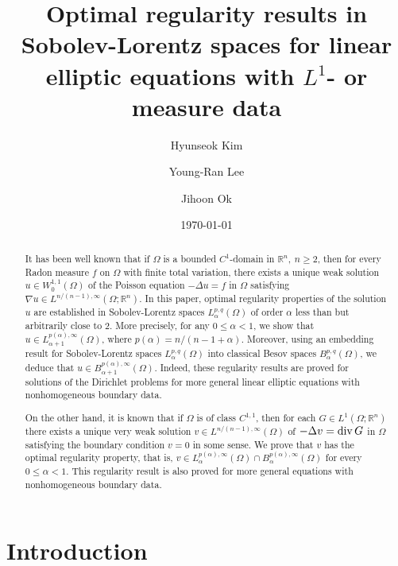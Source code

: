 \documentclass[reqno,centertags,11pt]{amsart}
\title[Optimal regularity results in Sobolev-Lorentz spaces]{Optimal regularity results in Sobolev-Lorentz spaces   for linear elliptic   equations with $L^1$- or measure data}
\date{\today}
\author[H. Kim]{Hyunseok Kim}
\author[Y.-R. Lee]{Young-Ran Lee}
\author[J. Ok]{Jihoon Ok}
\theoremstyle{definition}
\numberwithin{thm}{section}
\numberwithin{equation}{section}
\newcommand{\R}{{\mathbb{R}}}
\begin{document}
\begin{abstract}
It has been  well known that if  $\Omega$ is a bounded $C^1$-domain in $\R^n,\ n \ge 2$, then   for every Radon measure $f$ on $\Omega$ with finite total variation,  there exists a unique weak solution   $u\in W_0^{1,1}(\Omega )$ of the Poisson equation   $-\Delta u=f$ in $\Omega$ satisfying  $\nabla u \in L^{n/(n-1),\infty}(\Omega;\R^n )$. In this paper, optimal regularity properties of the solution $u$ are established   in Sobolev-Lorentz spaces $L_{\alpha}^{p,q}(\Omega )$   of order $ \alpha$ less than but arbitrarily close to $2$. More precisely, for any $0 \le \alpha<1$, we show that $u\in L_{\alpha+1}^{p(\alpha),\infty}(\Omega )$, where  $p(\alpha )= n/(n-1+\alpha )$. Moreover, using  an embedding result for Sobolev-Lorentz spaces $L_{\alpha}^{p,q}(\Omega )$ into classical   Besov spaces $B_\alpha^{p,q}(\Omega )$, we deduce  that  $u\in B_{\alpha+1}^{p(\alpha),\infty}(\Omega )$.
Indeed, these regularity results are proved for solutions of the Dirichlet problems for more general linear elliptic equations with    nonhomogeneous boundary data.

On the other hand, it is    known that if $\Omega$ is of class $C^{1,1}$,  then for each $G\in L^1 (\Omega ;\R^n )$ there exists a unique very weak solution   $v\in L^{n/(n-1),\infty}  (\Omega )$ of   $-\Delta v= {\rm div}\, G$ in $\Omega$ satisfying the   boundary condition $v=0$ in some sense. We prove that   $v$ has the optimal regularity property,  that is,   $v\in L_{\alpha}^{p(\alpha),\infty}(\Omega )\cap B_{\alpha}^{p(\alpha),\infty}(\Omega )$ for every $0 \le \alpha < 1$.
This regularity result is  also  proved for more general equations  with nonhomogeneous boundary data.
\end{abstract}


\maketitle

\section{Introduction}
\end{document}
